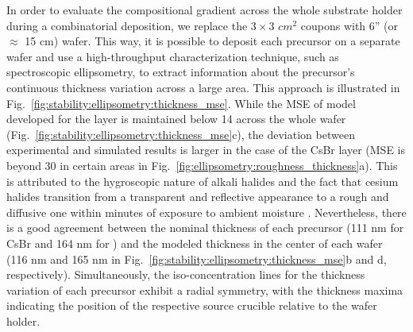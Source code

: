 In order to evaluate the compositional gradient across the whole substrate holder during a combinatorial deposition, we replace the $3\times3$ $cm^2$ coupons with 6'' (or $\approx$ 15 cm) wafer. This way, it is possible to deposit each precursor on a separate wafer and use a high-throughput characterization technique, such as spectroscopic ellipsometry, to extract information about the precursor's continuous thickness variation across a large area. This approach is illustrated in Fig.~\ref{fig:stability:ellipsometry:thickness_mse}. While the MSE of model developed for the  layer is maintained below 14 across the whole wafer (Fig.~\ref{fig:stability:ellipsometry:thickness_mse}c), the deviation between experimental and simulated results is larger in the case of the CsBr layer (MSE is beyond 30 in certain areas in Fig.~\ref{fig:ellipsometry:roughness_thickness}a). This is attributed to the hygroscopic nature of alkali halides and the fact that cesium halides transition from a transparent and reflective appearance to a rough and diffusive one within minutes of exposure to ambient moisture \cite{Chen2017All-Vacuum-Deposited11}. Nevertheless, there is a good agreement between the nominal thickness of each precursor (111 nm for CsBr and 164 nm for ) and the modeled thickness in the center of each wafer (116 nm and 165 nm in Fig.~\ref{fig:stability:ellipsometry:thickness_mse}b and d, respectively). Simultaneously, the iso-concentration lines for the thickness variation of each precursor exhibit a radial symmetry, with the thickness maxima indicating the position of the respective source crucible relative to the wafer holder. 


